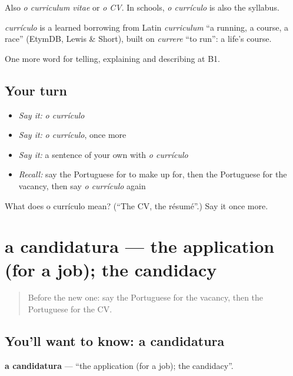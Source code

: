 Also \emph{o curriculum vitae} or \emph{o CV}. In schools, \emph{o currículo} is also the syllabus.

\begin{cousinweb}
\emph{currículo} is a learned borrowing from Latin \emph{curriculum} \textquotedblleft{}a running, a course, a race\textquotedblright{} (EtymDB, Lewis \& Short), built on \emph{currere} \textquotedblleft{}to run\textquotedblright{}: a life's course.
\end{cousinweb}

\begin{grammarlens}[title={What you've built}]
One more word for telling, explaining and describing at B1.
\end{grammarlens}

\subsection*{Your turn}
\begin{itemize}
\raggedright
  \item \emph{Say it:} \emph{o currículo}
  \item \emph{Say it:} \emph{o currículo}, once more
  \item \emph{Say it:} a sentence of your own with \emph{o currículo}
  \item \emph{Recall:} say the Portuguese for to make up for, then the Portuguese for the vacancy, then say \emph{o currículo} again
\end{itemize}

\begin{tcolorbox}[breakable,colback=teal!4,colframe=teal!35!black,title={Before you move on}]
What does o currículo mean? (\textquotedblleft{}The CV, the résumé\textquotedblright{}.) Say it once more.
\end{tcolorbox}
\section[a candidatura]{a candidatura — the application (for a job); the candidacy}

\label{lesson:PT-C355-candidatura}



\begin{quote}
Before the new one: say the Portuguese for the vacancy, then the Portuguese for the CV.
\end{quote}

\subsection*{You'll want to know: a candidatura}
\textbf{a candidatura} — \textquotedblleft{}the application (for a job); the candidacy\textquotedblright{}.

